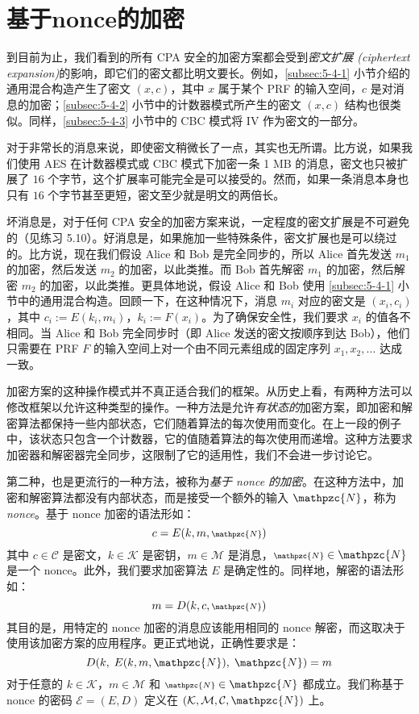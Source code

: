 \section{基于nonce的加密}\label{sec:5-5}

到目前为止，我们看到的所有 CPA 安全的加密方案都会受到\emph{密文扩展 (ciphertext expansion)}的影响，即它们的密文都比明文要长。例如，\ref{subsec:5-4-1} 小节介绍的通用混合构造产生了密文 $(x,c)$，其中 $x$ 属于某个 PRF 的输入空间，$c$ 是对消息的加密；\ref{subsec:5-4-2} 小节中的计数器模式所产生的密文 $(x,c)$ 结构也很类似。同样，\ref{subsec:5-4-3} 小节中的 CBC 模式将 IV 作为密文的一部分。

对于非常长的消息来说，即使密文稍微长了一点，其实也无所谓。比方说，如果我们使用 AES 在计数器模式或 CBC 模式下加密一条 1 MB 的消息，密文也只被扩展了 $16$ 个字节，这个扩展率可能完全是可以接受的。然而，如果一条消息本身也只有 $16$ 个字节甚至更短，密文至少就是明文的两倍长。

坏消息是，对于任何 CPA 安全的加密方案来说，一定程度的密文扩展是不可避免的（见练习 5.10）。好消息是，如果施加一些特殊条件，密文扩展也是可以绕过的。比方说，现在我们假设 Alice 和 Bob 是完全同步的，所以 Alice 首先发送 $m_1$ 的加密，然后发送 $m_2$ 的加密，以此类推。而 Bob 首先解密 $m_1$ 的加密，然后解密 $m_2$ 的加密，以此类推。更具体地说，假设 Alice 和 Bob 使用 \ref{subsec:5-4-1} 小节中的通用混合构造。回顾一下，在这种情况下，消息 $m_i$ 对应的密文是 $(x_i,c_i)$，其中 $c_i:=E(k_i,m_i)$，$k_i:=F(x_i)$。为了确保安全性，我们要求 $x_i$ 的值各不相同。当 Alice 和 Bob 完全同步时（即 Alice 发送的密文按顺序到达 Bob），他们只需要在 PRF $F$ 的输入空间上对一个由不同元素组成的固定序列 $x_1,x_2,\dots$ 达成一致。

加密方案的这种操作模式并不真正适合我们的框架。从历史上看，有两种方法可以修改框架以允许这种类型的操作。一种方法是允许\emph{有状态的}加密方案，即加密和解密算法都保持一些内部状态，它们随着算法的每次使用而变化。在上一段的例子中，该状态只包含一个计数器，它的值随着算法的每次使用而递增。这种方法要求加密器和解密器完全同步，这限制了它的适用性，我们不会进一步讨论它。

第二种，也是更流行的一种方法，被称为\emph{基于 nonce 的加密}。在这种方法中，加密和解密算法都没有内部状态，而是接受一个额外的输入 $\mathpzc{N}$，称为 \emph{nonce}。基于 nonce 加密的语法形如：
\[
c=E(k,m,{\scriptstyle\mathpzc{N}})
\]
其中 $c\in\mathcal{C}$ 是密文，$k\in\mathcal{K}$ 是密钥，$m\in\mathcal{M}$ 是消息，${\scriptstyle\mathpzc{N}}\in\mathpzc{N}$ 是一个 nonce。此外，我们要求加密算法 $E$ 是确定性的。同样地，解密的语法形如：
\[
m=D(k,c,{\scriptstyle\mathpzc{N}})
\]
其目的是，用特定的 nonce 加密的消息应该能用相同的 nonce 解密，而这取决于使用该加密方案的应用程序。更正式地说，正确性要求是：
\[
D(k,\;E(k,m,\mathpzc{N}),\;\mathpzc{N})=m
\]
对于任意的 $k\in\mathcal{K}$，$m\in\mathcal{M}$ 和 ${\scriptstyle\mathpzc{N}}\in\mathpzc{N}$ 都成立。我们称基于 nonce 的密码 $\mathcal{E}=(E,D)$ 定义在 $(\mathcal{K},\mathcal{M},\mathcal{C},\mathpzc{N})$ 上。

